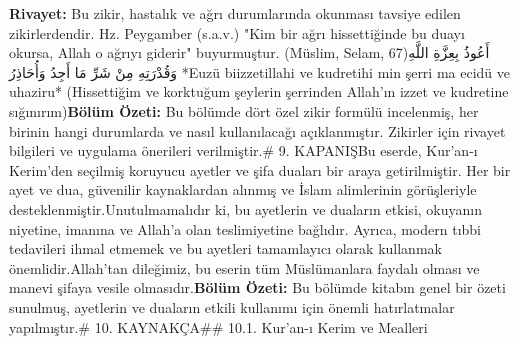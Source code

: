 \documentclass[12pt,a4paper]{article}
\begin{document}
\textbf{Rivayet:} Bu zikir, hastalık ve ağrı durumlarında okunması tavsiye edilen zikirlerdendir. Hz. Peygamber (s.a.v.) "Kim bir ağrı hissettiğinde bu duayı okursa, Allah o ağrıyı giderir" buyurmuştur. (Müslim, Selam, 67)أَعُوذُ بِعِزَّةِ اللَّهِ وَقُدْرَتِهِ مِنْ شَرِّ مَا أَجِدُ وَأُحَاذِرُ
*Euzü biizzetillahi ve kudretihi min şerri ma ecidü ve uhaziru*
(Hissettiğim ve korktuğum şeylerin şerrinden Allah'ın izzet ve kudretine sığınırım)\textbf{Bölüm Özeti:}
Bu bölümde dört özel zikir formülü incelenmiş, her birinin hangi durumlarda ve nasıl kullanılacağı açıklanmıştır. Zikirler için rivayet bilgileri ve uygulama önerileri verilmiştir.\# 9. KAPANIŞBu eserde, Kur'an-ı Kerim'den seçilmiş koruyucu ayetler ve şifa duaları bir araya getirilmiştir. Her bir ayet ve dua, güvenilir kaynaklardan alınmış ve İslam alimlerinin görüşleriyle desteklenmiştir.Unutulmamalıdır ki, bu ayetlerin ve duaların etkisi, okuyanın niyetine, imanına ve Allah'a olan teslimiyetine bağlıdır. Ayrıca, modern tıbbi tedavileri ihmal etmemek ve bu ayetleri tamamlayıcı olarak kullanmak önemlidir.Allah'tan dileğimiz, bu eserin tüm Müslümanlara faydalı olması ve manevi şifaya vesile olmasıdır.\textbf{Bölüm Özeti:}
Bu bölümde kitabın genel bir özeti sunulmuş, ayetlerin ve duaların etkili kullanımı için önemli hatırlatmalar yapılmıştır.\# 10. KAYNAKÇA\#\# 10.1. Kur'an-ı Kerim ve Mealleri
\end{document}
